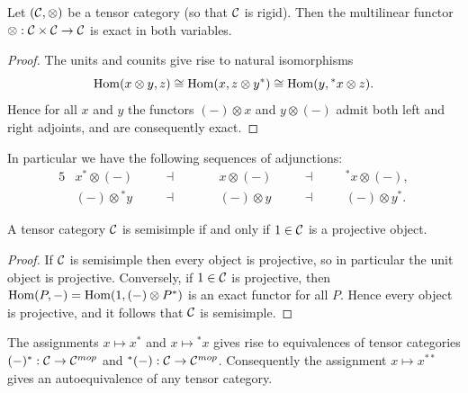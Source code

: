\documentclass{amsart}
\begin{document}
\begin{lemma} \label{lma:RigidIsExact}
	Let $(\mathcal C, \otimes)$ be a tensor category (so that $\mathcal C$ is rigid). Then the multilinear functor $\otimes: \mathcal C \times \mathcal C \to \mathcal C$ is exact in both variables. 
\end{lemma}

\begin{proof}
	The units and counits give rise to natural isomorphisms %
 \begin{equation*} 
 	\operatorname{Hom}(x \otimes y, z) \cong \operatorname{Hom}( x, z \otimes y^*) \cong \operatorname{Hom}(y, {}^*x \otimes z).
 \end{equation*}
	Hence for all $x$ and $y$ the functors $(-)\otimes x$ and $y \otimes (-)$ admit both left and right adjoints, and are consequently exact. 
\end{proof}

\noindent In particular we have the following sequences of adjunctions:
\begin{alignat*}{5}
	& x^* \otimes (-)  \quad & &  \dashv \quad &&  \quad x \otimes (-)  \quad &&  \dashv &&  \quad {}^*x \otimes (-), \\
	& (-) \otimes {}^* y  \quad & &  \dashv \quad &&  \quad (-) \otimes y  \quad &&  \dashv &&  \quad (-) \otimes y^*. 
\end{alignat*}

\begin{corollary}
	A tensor category $\mathcal C$ is semisimple if and only if $1 \in \mathcal C$ is a projective object. 
\end{corollary}

\begin{proof}
	If $\mathcal C$ is semisimple then every object is projective, so in particular the unit object is projective. Conversely, if $1 \in \mathcal C$ is projective, then $\operatorname{Hom}(P, -) = \operatorname{Hom}( 1, (-) \otimes P^*)$ is an exact functor for all $P$. Hence every object is projective, and it follows that $\mathcal C$ is semisimple.  
\end{proof}

\begin{lemma}
	The assignments $x \mapsto x^*$ and $x \mapsto {}^*x$ gives rise to equivalences of tensor categories $(-)^*: \mathcal C \to \mathcal C^{mop}$ and ${}^*(-): \mathcal C \to \mathcal C^{mop}$. Consequently the assignment $x \mapsto x^{**}$ gives an autoequivalence of any tensor category. 
\end{lemma}
\end{document}
